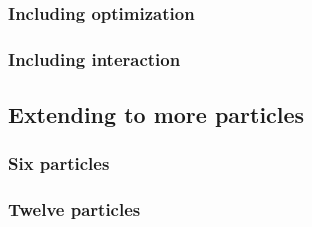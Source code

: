 \subsubsection{Including optimization}

\subsubsection{Including interaction}

\subsection{Extending to more particles}

\subsubsection{Six particles}

\subsubsection{Twelve particles}


